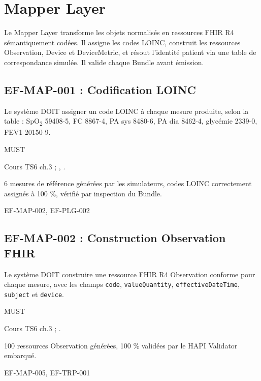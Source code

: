 \section{Mapper Layer}
\label{sec:ef-mapper}

Le Mapper Layer transforme les objets normalisés en ressources FHIR R4 sémantiquement codées. Il assigne les codes LOINC, construit les ressources Observation, Device et DeviceMetric, et résout l'identité patient via une table de correspondance simulée. Il valide chaque Bundle avant émission.

\subsection*{EF-MAP-001 : Codification LOINC}
\begin{description}[leftmargin=2.5cm, style=nextline]
  \item[Énoncé] Le système DOIT assigner un code LOINC à chaque mesure produite, selon la table : SpO\textsubscript{2} 59408-5, FC 8867-4, PA sys 8480-6, PA dia 8462-4, glycémie 2339-0, FEV1 20150-9.
  \item[Priorité] MUST
  \item[Source] Cours TS6 ch.3 ; \cite{hl7_fhir_r4}, \cite{ihe_pcd_tf}.
  \item[Recette] 6 mesures de référence générées par les simulateurs, codes LOINC correctement assignés à 100 \%, vérifié par inspection du Bundle.
  \item[Lié à] EF-MAP-002, EF-PLG-002
\end{description}

\subsection*{EF-MAP-002 : Construction Observation FHIR}
\begin{description}[leftmargin=2.5cm, style=nextline]
  \item[Énoncé] Le système DOIT construire une ressource FHIR R4 Observation conforme pour chaque mesure, avec les champs \texttt{code}, \texttt{valueQuantity}, \texttt{effectiveDateTime}, \texttt{subject} et \texttt{device}.
  \item[Priorité] MUST
  \item[Source] Cours TS6 ch.3 ; \cite{hl7_fhir_r4}.
  \item[Recette] 100 ressources Observation générées, 100 \% validées par le HAPI Validator embarqué.
  \item[Lié à] EF-MAP-005, EF-TRP-001
\end{description}


